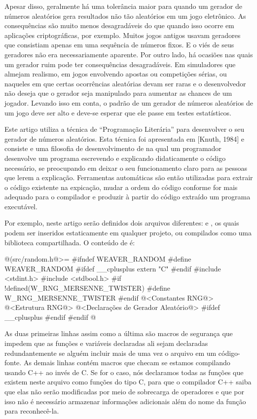 Apesar disso, geralmente há uma tolerância maior para quando um
gerador de números aleatórios gera resultados não tão aleatórios em um
jogo eletrônico. As consequências são muito menos desagradáveis do que
quando isso ocorre em aplicações criptográficas, por exemplo. Muitos
jogos antigos usavam geradores que consistiam apenas em uma sequência
de números fixos. E o viés de seus geradores não era necessariamente
aparente. Por outro lado, há ocasiões nas quais um gerador ruim pode
ter consequências desagradáveis. Em simuladores que almejam realismo,
em jogos envolvendo apostas ou competições sérias, ou naqueles em que
certas ocorrências aleatórias devam ser raras e o desenvolvedor não
deseja que o gerador seja manipulado para aumentar as chances de um
jogador. Levando isso em conta, o padrão de um gerador de números
aleatórios de um jogo deve ser alto e deve-se esperar que ele passe em
testes estatísticos.


Este artigo utiliza a técnica de ``Programação Literária'' para
desenvolver o seu gerador de números aleatórios. Esta técnica foi apresentada
em [Knuth, 1984] e consiste e uma filosofia de desenvolvimento de
 na qual um programador desenvolve um programa escrevendo
e explicando didaticamente o código necessário, se preocupando em
deixar o seu funcionamento claro para as pessoas que lerem a
explicação. Ferramentas automáticas são então utilizadas para extrair
o código existente na expicação, mudar a ordem do código conforme for
mais adequado para o compilador e produzir à partir do código extraído
um programa executável.

Por exemplo, neste artigo serão definidos dois arquivos
diferentes:  e , os quais
podem ser inseridos estaticamente em qualquer projeto, ou compilados
como uma biblioteca compartilhada. O conteúdo de 
é:

\iniciocodigo
@(src/random.h@>=
#ifndef WEAVER_RANDOM
#define WEAVER_RANDOM
#ifdef __cplusplus
extern "C" {
#endif
#include <stdint.h>
#include <stdbool.h>
#if !defined(W_RNG_MERSENNE_TWISTER)
#define W_RNG_MERSENNE_TWISTER
#endif
@<Constantes RNG@>
@<Estrutura RNG@>
@<Declarações de Gerador Aleatório@>
#ifdef __cplusplus
}
#endif
#endif
@
\fimcodigo

As duas primeiras linhas assim como a última são macros de segurança
que impedem que as funções e variáveis declaradas ali sejam declaradas
redundantemente se alguém incluir mais de uma vez o arquivo em um
código-fonte. As demais linhas contém macros que checam se estamos
compilando usando C++ ao invés de C. Se for o caso, nós declaramos
todas as funções que existem neste arquivo como funções do tipo C,
para que o compilador C++ saiba que elas não serão modificadas por
meio de sobrecarga de operadores e que por isso não é necessário
armazenar informações adicionais além do nome da função para
reconhecê-la.

